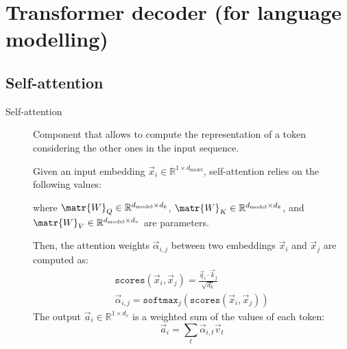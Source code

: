 \section{Transformer decoder (for language modelling)}


\subsection{Self-attention}

\begin{description}
    \item[Self-attention] 
        Component that allows to compute the representation of a token considering the other ones in the input sequence. 

        Given an input embedding $\vec{x}_i \in \mathbb{R}^{1 \times d_\text{model}}$, self-attention relies on the following values:
        where $\matr{W}_Q \in \mathbb{R}^{d_\text{model} \times d_k}$, $\matr{W}_K \in \mathbb{R}^{d_\text{model} \times d_k}$, and $\matr{W}_V \in \mathbb{R}^{d_\text{model} \times d_v}$ are parameters.

        Then, the attention weights $\vec{\alpha}_{i,j}$ between two embeddings $\vec{x}_i$ and $\vec{x}_j$ are computed as:
        \[
            \begin{gathered}
                \texttt{scores}(\vec{x}_i, \vec{x}_j) = \frac{\vec{q}_i \cdot \vec{k}_j}{\sqrt{d_k}} \\
                \vec{\alpha}_{i,j} = \texttt{softmax}_j\left( \texttt{scores}(\vec{x}_i, \vec{x}_j) \right)
            \end{gathered}
        \]
        The output $\vec{a}_i \in \mathbb{R}^{1 \times d_v}$ is a weighted sum of the values of each token:
        \[ \vec{a}_i = \sum_{t} \vec{\alpha}_{i,t} \vec{v}_t \]


\end{description}
